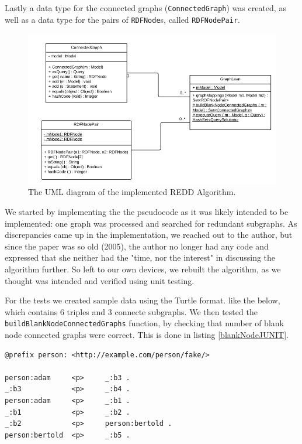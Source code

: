 Lastly a data type for the connected graphs (\texttt{ConnectedGraph}) was created, as well as a data type for the pairs of \texttt{RDFNode}s, called \texttt{RDFNodePair}.

\begin{figure}[h]
\centering
\includegraphics[width=\textwidth]{Figures/REDDuml.png}
\caption{The UML diagram of the implemented REDD Algorithm.}
\end{figure}

We started by implementing the the pseudocode as it was likely intended to be implemented: one graph was processed and searched for redundant subgraphs. As discrepancies came up in the implementation, we reached out to the author, but since the paper was so old (2005), the author no longer had any code and expressed that she neither had the "time, nor the interest" in discussing the algorithm further. So left to our own devices, we rebuilt the algorithm, as we thought was intended and verified using unit testing.

For the tests we created sample data using the Turtle format. like the below, which contains 6 triples and 3 connecte subgraphs. We then tested the \texttt{buildBlankNodeConnectedGraphs} function, by checking that number of blank node connected graphs were correct. This is done in listing \ref{blankNodeJUNIT}.

\begin{lstlisting}[caption={Some sample data that we created for unit testing, written in Turtle.}]
@prefix person: <http://example.com/person/fake/>

person:adam		<p>		_:b3 .
_:b3			<p>		_:b4 .
person:adam		<p>		_:b1 .
_:b1			<p>		_:b2 .
_:b2			<p>		person:bertold .
person:bertold	<p>		_:b5 .
\end{lstlisting}

